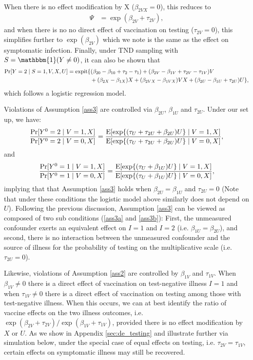 \begin{appendix}
\begin{refsection}
\begin{align*}
\end{align*}
When there is no effect modification by X ($\beta_{2VX} = 0$), this reduces to 
\begin{align*}
    \Psi &= \exp(\beta_{2V} + \tau_{2V}),
\end{align*}
and when there is no no direct effect of vaccination on testing ($\tau_{2V} = 0$), this simplifies further to $\exp(\beta_{2V})$ which we note is the same as the effect on symptomatic infection. Finally, under TND sampling with $S=\mathbbm{1}(Y \neq 0)$, it can also be shown that
\begin{align*}
    \Pr[Y=2 \mid  S=1, V, X, U] &= \mathrm{expit}\{(\beta_{20}-\beta_{10}+\tau_2 - \tau_1) + (\beta_{2V} - \beta_{1V} + \tau_{2V} - \tau_{1V}) V\\ &\qquad\qquad+(\beta_{2X}-\beta_{1X})X+ (\beta_{2VX} - \beta_{1VX})VX + (\beta_{2U} - \beta_{1U} + \tau_{2U})U\},
\end{align*}
which follows a logistic regression model.

Violations of Assumption \ref{ass3} are controlled via $\beta_{2U}$, $\beta_{1U}$ and $\tau_{2U}$. Under our set up, we have:
\begin{align*}
    \dfrac{\Pr[Y^0=2 \mid V=1,X]}{\Pr[Y^0=2\mid V=0,X]}=\dfrac{\operatorname{E}[\exp\{(\tau_U  + \tau_{2U}+\beta_{2U})U\}\mid V=1, X]}{\operatorname{E}[\exp\{(\tau_U  + \tau_{2U}+\beta_{2U})U\}\mid V=0, X]},
\end{align*}
and 
\begin{align*}
    \dfrac{\Pr[Y^0=1 \mid V=1,X]}{\Pr[Y^0=1\mid V=0,X]}=\dfrac{\operatorname{E}[\exp\{(\tau_U  +\beta_{1U})U\}\mid V=1, X]}{\operatorname{E}[\exp\{(\tau_U +\beta_{1U})U\}\mid V=0, X]},
\end{align*}
implying that that Assumption \ref{ass3} holds when $\beta_{2U}=\beta_{1U}$ and $\tau_{2U}=0$ (Note that under these conditions the logistic model above similarly does not depend on $U$). Following the previous discussion, Assumption \ref{ass3} can be viewed as composed of two sub conditions (\ref{ass3a} and \ref{ass3b}): First, the unmeasured confounder exerts an equivalent effect on $I=1$ and $I=2$ (i.e. $\beta_{1U}=\beta_{2U}$), and second, there is no interaction between the unmeasured confounder and the source of illness for the probability of testing on the multiplicative scale (i.e. $\tau_{2U}=0$). 

Likewise, violations of Assumption \ref{ass2} are controlled by $\beta_{1V}$ and $\tau_{1V}$. When $\beta_{1V} \neq 0$ there is a direct effect of vaccination on test-negative illness $I = 1$ and when $\tau_{1V} \neq 0$ there is a direct effect of vaccination on testing among those with test-negative illness. When this occurs, we can at best identify the ratio of vaccine effects on the two illness outcomes, i.e. $\exp(\beta_{2V} + \tau_{2V})/\exp(\beta_{1V} + \tau_{1V})$, provided there is no effect modification by $X$ or $U$. As we show in Appendix \ref{sec:de_testing} and illustrate further via simulation below, under the special case of equal effects on testing, i.e. $\tau_{2V} = \tau_{1V}$, certain effects on symptomatic illness may still be recovered.




\end{refsection}
\end{appendix}
